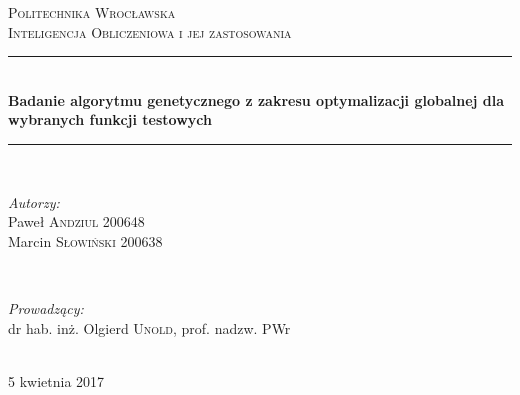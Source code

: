 \begin{titlepage}

\newcommand{\HRule}{\rule{\linewidth}{0.5mm}} 
\center 

\textsc{\LARGE Politechnika Wrocławska}\\[1.5cm] 
\textsc{\Large Inteligencja Obliczeniowa i jej zastosowania}\\[0.5cm] 
\HRule \\[0.5cm]
{ \huge \bfseries Badanie algorytmu genetycznego z zakresu optymalizacji globalnej dla wybranych funkcji testowych}\\[0.5cm] 
\HRule \\[1.6cm]
 
\begin{minipage}{0.4\textwidth}
\begin{flushleft} \large
\emph{Autorzy:}\\
Paweł  \textsc{Andziul} 200648 \\
Marcin  \textsc{Słowiński} 200638 \\
\end{flushleft}
\end{minipage}
~
\begin{minipage}{0.4\textwidth}
\begin{flushright} \large
\emph{Prowadzący:} \\
dr hab. inż. Olgierd \textsc{Unold}, prof. nadzw. PWr
\end{flushright}
\end{minipage}\\[4cm]

\vfill 
{\large 5 kwietnia 2017}\\[3cm] 

\end{titlepage}